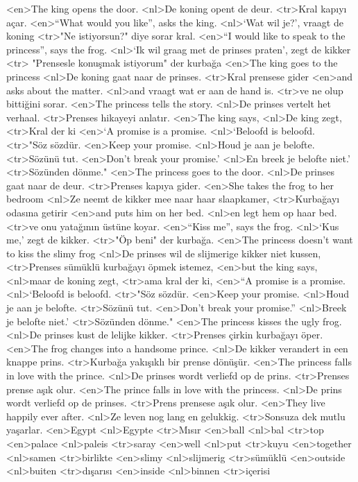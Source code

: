 <en>The king opens the door.
<nl>De koning opent de deur.
<tr>Kral kapıyı açar.
<en>“What would you like”, asks the king.
<nl>`Wat wil je?', vraagt de koning
<tr>"Ne istiyorsun?" diye sorar kral.
<en>“I would like to speak to the princess”, says the frog.
<nl>`Ik wil graag met de prinses praten', zegt de kikker
<tr> "Prensesle konuşmak istiyorum" der kurbağa
<en>The king goes to the princess
<nl>De koning gaat naar de prinses.
<tr>Kral prensese gider
<en>and asks about the matter.
<nl>and vraagt wat er aan de hand is.
<tr>ve ne olup bittiğini sorar.
<en>The princess tells the story.
<nl>De prinses vertelt het verhaal.
<tr>Prenses hikayeyi anlatır.
<en>The king says,
<nl>De king zegt,
<tr>Kral der ki
<en>`A promise is a promise.
<nl>`Beloofd is beloofd.
<tr>"Söz sözdür.
<en>Keep your promise.
<nl>Houd je aan je belofte.
<tr>Sözünü tut.
<en>Don’t break your promise.'
<nl>En breek je belofte niet.'
<tr>Sözünden dönme."
<en>The princess goes to the door.
<nl>De prinses gaat naar de deur.
<tr>Prenses kapıya gider.
<en>She takes the frog to her bedroom
<nl>Ze neemt de kikker mee naar haar slaapkamer,
<tr>Kurbağayı odasına getirir
<en>and puts him on her bed. 
<nl>en legt hem op haar bed.
<tr>ve onu yatağının üstüne koyar.
<en>“Kiss me”, says the frog.
<nl>`Kus me,' zegt de kikker.
<tr>"Öp beni" der kurbağa.
<en>The princess doesn’t want to kiss the slimy frog
<nl>De prinses wil de slijmerige kikker niet kussen,
<tr>Prenses sümüklü kurbağayı öpmek istemez, 
<en>but the king says,
<nl>maar de koning zegt,
<tr>ama kral der ki,
<en>“A promise is a promise.
<nl>`Beloofd is beloofd.
<tr>"Söz sözdür.
<en>Keep your promise.
<nl>Houd je aan je belofte.
<tr>Sözünü tut.
<en>Don’t break your promise.”
<nl>Breek je belofte niet.'
<tr>Sözünden dönme."
<en>The princess kisses the ugly frog.
<nl>De prinses kust de lelijke kikker.
<tr>Prenses çirkin kurbağayı öper.
<en>The frog changes into a handsome prince.
<nl>De kikker verandert in een knappe prins.
<tr>Kurbağa yakışıklı bir prense dönüşür.
<en>The princess falls in love  with the prince.
<nl>De prinses wordt verliefd op de prins.
<tr>Prenses prense aşık olur.
<en>The prince falls in love with the princess.
<nl>De prins wordt verliefd op de prinses.
<tr>Prens prensese aşık olur.
<en>They live happily ever after.
<nl>Ze leven nog lang en gelukkig.
<tr>Sonsuza dek mutlu yaşarlar.
<en>Egypt
<nl>Egypte
<tr>Mısır
<en>ball
<nl>bal
<tr>top
<en>palace
<nl>paleis
<tr>saray
<en>well
<nl>put
<tr>kuyu
<en>together
<nl>samen
<tr>birlikte
<en>slimy
<nl>slijmerig
<tr>sümüklü
<en>outside
<nl>buiten
<tr>dışarısı
<en>inside
<nl>binnen
<tr>içerisi
